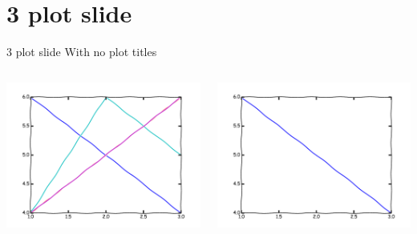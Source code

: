 \section{3 plot slide}
\begin{frame}{3 plot slide}
With no plot titles
\begin{columns}
\begin{column}{0.33\textwidth}
\begin{center}
\includegraphics[width=\textwidth]{example/plot1.pdf}
\\
\end{center}
\end{column}
\begin{column}{0.33\textwidth}
\begin{center}
\includegraphics[width=\textwidth]{example/plot2.pdf}

\end{center}
\end{column}
\end{columns}
\end{frame}
